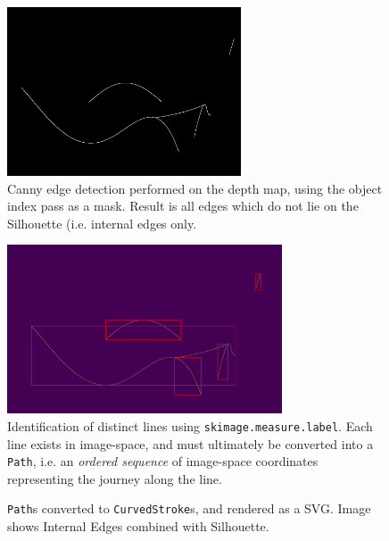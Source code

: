\begin{figure}[h!]
	\centering
	\includegraphics[height=5cm]{images/int_edge.png}
	\caption{Canny edge detection performed on the depth map, using the object index pass as a mask. Result is all edges which do not lie on the Silhouette (i.e. internal edges only.}\label{int_edge}
\end{figure}

\begin{figure}[h!]
	\centering
	\includegraphics[height=5cm]{images/int_labels.png}
	\caption{Identification of distinct lines using \texttt{skimage.measure.label}. Each line exists in image-space, and must ultimately be converted into a \texttt{Path}, i.e. an \emph{ordered sequence} of image-space coordinates representing the journey along the line.}\label{int_labels}
\end{figure}

\begin{figure}[h!]
	\centering
	
	\caption{\texttt{Path}s converted to \texttt{CurvedStroke}s, and rendered as a SVG. Image shows Internal Edges combined with Silhouette.}\label{int}
\end{figure}

\newpage
\FloatBarrier
